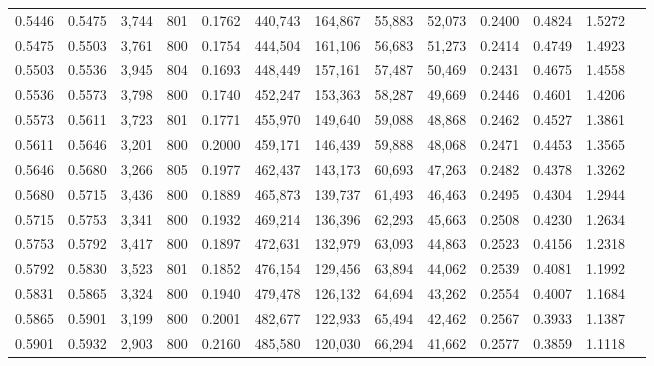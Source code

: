 \begin{tabular}{rrrrrrrrrrrrr}
0.5446 & 0.5475 &  3,744 & 801 &                                     0.1762 & 440,743 & 164,867 &  55,883 &  52,073 & 0.2400 & 0.4824 & 1.5272 \\
0.5475 & 0.5503 &  3,761 & 800 &                                     0.1754 & 444,504 & 161,106 &  56,683 &  51,273 & 0.2414 & 0.4749 & 1.4923 \\
0.5503 & 0.5536 &  3,945 & 804 &                                     0.1693 & 448,449 & 157,161 &  57,487 &  50,469 & 0.2431 & 0.4675 & 1.4558 \\
0.5536 & 0.5573 &  3,798 & 800 &                                     0.1740 & 452,247 & 153,363 &  58,287 &  49,669 & 0.2446 & 0.4601 & 1.4206 \\
0.5573 & 0.5611 &  3,723 & 801 &                                     0.1771 & 455,970 & 149,640 &  59,088 &  48,868 & 0.2462 & 0.4527 & 1.3861 \\
0.5611 & 0.5646 &  3,201 & 800 &                                     0.2000 & 459,171 & 146,439 &  59,888 &  48,068 & 0.2471 & 0.4453 & 1.3565 \\
0.5646 & 0.5680 &  3,266 & 805 &                                     0.1977 & 462,437 & 143,173 &  60,693 &  47,263 & 0.2482 & 0.4378 & 1.3262 \\
0.5680 & 0.5715 &  3,436 & 800 &                                     0.1889 & 465,873 & 139,737 &  61,493 &  46,463 & 0.2495 & 0.4304 & 1.2944 \\
0.5715 & 0.5753 &  3,341 & 800 &                                     0.1932 & 469,214 & 136,396 &  62,293 &  45,663 & 0.2508 & 0.4230 & 1.2634 \\
0.5753 & 0.5792 &  3,417 & 800 &                                     0.1897 & 472,631 & 132,979 &  63,093 &  44,863 & 0.2523 & 0.4156 & 1.2318 \\
0.5792 & 0.5830 &  3,523 & 801 &                                     0.1852 & 476,154 & 129,456 &  63,894 &  44,062 & 0.2539 & 0.4081 & 1.1992 \\
0.5831 & 0.5865 &  3,324 & 800 &                                     0.1940 & 479,478 & 126,132 &  64,694 &  43,262 & 0.2554 & 0.4007 & 1.1684 \\
0.5865 & 0.5901 &  3,199 & 800 &                                     0.2001 & 482,677 & 122,933 &  65,494 &  42,462 & 0.2567 & 0.3933 & 1.1387 \\
0.5901 & 0.5932 &  2,903 & 800 &                                     0.2160 & 485,580 & 120,030 &  66,294 &  41,662 & 0.2577 & 0.3859 & 1.1118 \\

\end{tabular}
